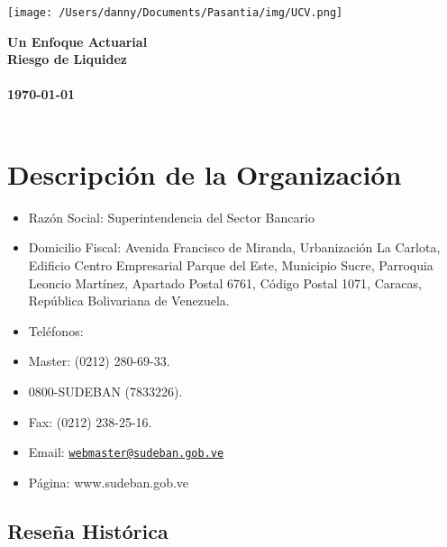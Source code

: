 \documentclass[10pt,]{article}
\title{}
\author{}
\date{}
\begin{document}
\begin{titlepage}
\pagecolor{gray40}
\noindent
\texttt{[image: /Users/danny/Documents/Pasantia/img/UCV.png]}\\[-1em]
\color{white}
\makebox[0pt][l]{\rule{1.3\textwidth}{1pt}}
\par
\noindent
\textbf{\textsf{Un Enfoque Actuarial}}\\
\Huge\textbf{Riesgo de Liquidez} \\ \\
\vfill
\noindent
\small{\textbf{\today}} \\ \\
\end{titlepage}
\restoregeometry %
\nopagecolor%

\tableofcontents

\hypertarget{descripcion-de-la-organizacion}{%
\section{Descripción de la
Organización}\label{descripcion-de-la-organizacion}}

\begin{itemize}
\item
  Razón Social: Superintendencia del Sector Bancario
\item
  Domicilio Fiscal: Avenida Francisco de Miranda, Urbanización La
  Carlota, Edificio Centro Empresarial Parque del Este, Municipio Sucre,
  Parroquia Leoncio Martínez, Apartado Postal 6761, Código Postal 1071,
  Caracas, República Bolivariana de Venezuela.
\item
  Teléfonos:
\item
  Master: (0212) 280-69-33.
\item
  0800-SUDEBAN (7833226).
\item
  Fax: (0212) 238-25-16.
\item
  Email:
  \href{mailto:webmaster@sudeban.gob.ve}{\nolinkurl{webmaster@sudeban.gob.ve}}
\item
  Página: www.sudeban.gob.ve
\end{itemize}

\hypertarget{resena-historica}{%
\subsection{Reseña Histórica}\label{resena-historica}}
\end{document}
